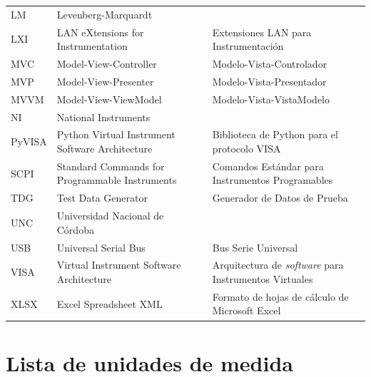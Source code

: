 \begin{xltabular}{\linewidth}{lXX}
    LM & Levenberg-Marquardt & \\
    LXI & LAN eXtensions for Instrumentation & Extensiones LAN para Instrumentación \\
    MVC & Model-View-Controller & Modelo-Vista-Controlador \\
    MVP & Model-View-Presenter & Modelo-Vista-Presentador \\
    MVVM & Model-View-ViewModel & Modelo-Vista-VistaModelo \\
    NI & National Instruments & \\
    PyVISA & Python Virtual Instrument Software Architecture & Biblioteca de Python para el protocolo VISA \\
    SCPI & Standard Commands for Programmable Instruments & Comandos Estándar para Instrumentos Programables \\
    TDG & Test Data Generator & Generador de Datos de Prueba \\
    UNC & Universidad Nacional de Córdoba & \\
    USB & Universal Serial Bus & Bus Serie Universal \\
    VISA & Virtual Instrument Software Architecture & Arquitectura de \emph{software} para Instrumentos Virtuales \\
    XLSX & Excel Spreadsheet XML & Formato de hojas de cálculo de Microsoft Excel \\
\end{xltabular}

\section*{Lista de unidades de medida}

